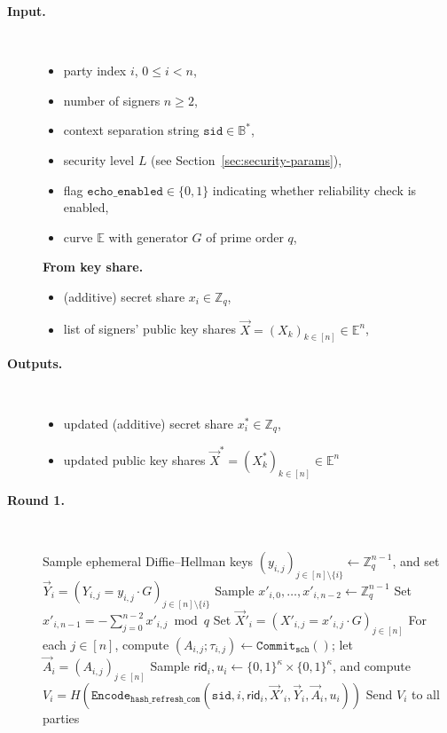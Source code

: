 \documentclass[11pt]{article}
\newcommand{\sid}{\ensuremath{\mathtt{sid}}}
\newcommand{\var}[1]{\ensuremath{\mathtt{#1}}}
\newcommand{\commit}[1]{\ensuremath{\mathtt{Commit}_{\mathtt{#1}}}}
\newcommand{\Encode}[1][]{\ensuremath{\mathtt{Encode}_{\mathtt{#1}}}}
\newcommand{\rid}{\textsf{rid}}
\newcommand{\E}{\mathbb{E}}
\newcommand{\Z}{\mathbb{Z}}
\newcommand{\?}[1]{\stackrel{?}{#1}}
\newcommand{\Bit}{\ensuremath{\{0{,}1\}}}
\newcommand{\Byte}{\ensuremath{\mathbb{B}}}
\begin{document}
\begin{description}
    \item[\bf Input.] \
    \begin{itemize}[noitemsep,topsep=0pt]
    \item party index $i$, $0 \le i < n$,
    \item number of signers $n \ge 2$,
    \item context separation string $\sid \in \Byte^*$,
    \item security level $L$ (see Section~\ref{sec:security-params}),
    \item flag $\var{echo\_enabled} \in \Bit$ indicating whether reliability check is enabled,
    \item curve $\E$ with generator $G$ of prime order $q$,
    \end{itemize}
    \textbf{From key share.}
    \begin{itemize}[noitemsep,topsep=0pt]
    \item (additive) secret share $x_i \in \Z_q$,
    \item list of signers' public key shares $\vec X = (X_k)_{k\in[n]} \in \E^n$,
    \end{itemize}

    \item[\bf Outputs.] \
    \begin{itemize}[noitemsep,topsep=0pt]
    \item updated (additive) secret share $x^*_i \in \Z_q$,
    \item updated public key shares $\vec X^* = (X^*_k)_{k\in[n]} \in \E^n$
    \end{itemize}

    \item[\textbf{Round 1.}] \
    \begin{algorithmic}[1]
        \State Sample ephemeral Diffie--Hellman keys $(y_{i,j})_{j \in [n] \setminus \{i\}} \gets \Z_q^{n-1}$,
               and set $\vec Y_i = (Y_{i,j} = y_{i,j} \cdot G)_{j \in [n] \setminus \{i\}}$
        \State Sample $x'_{i,0}, \ldots, x'_{i,n-2} \gets \Z_q^{n-1}$
        \State Set $x'_{i,n-1} = -\sum_{j=0}^{n-2} x'_{i,j} \bmod q$
        \State Set $\vec X'_i = (X'_{i,j} = x'_{i,j} \cdot G)_{j \in [n]}$
        \State For each $j \in [n]$, compute $(A_{i,j}; \tau_{i,j}) \gets \commit{sch}()$;
               let $\vec A_i = (A_{i,j})_{j \in [n]}$
        \State Sample $\rid_i, u_i \gets \Bit^\kappa \times \Bit^\kappa$,
               and compute $V_i = H(\Encode[hash\_refresh\_com](\sid, i, \rid_i, \vec X'_i, \vec Y_i, \vec A_i, u_i))$
        \State Send $V_i$ to all parties
    \end{algorithmic}


\end{description}
\end{document}
